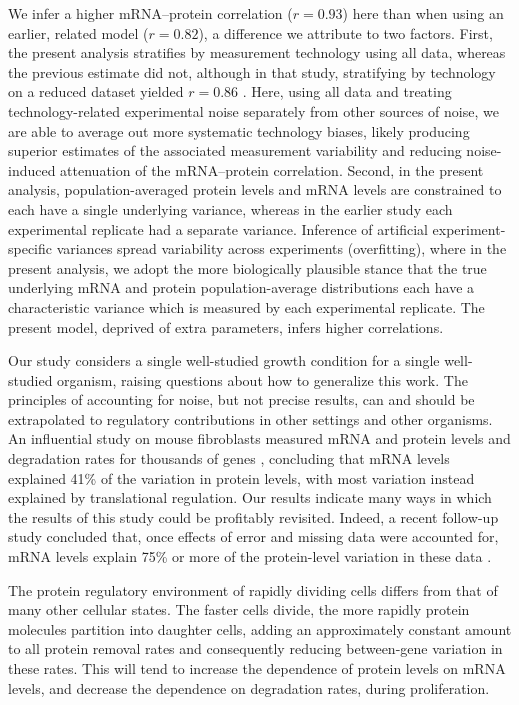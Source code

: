 \documentclass[10pt]{article}
\begin{document}
We infer a higher mRNA--protein correlation ($r=0.93$) here than when using an
earlier, related model \cite{Franks2014} ($r=0.82$), a difference we attribute
to two factors. First, the present analysis stratifies by measurement
technology using all data, whereas the previous estimate did not, although in
that study, stratifying by technology on a reduced dataset yielded $r=0.86$
\cite{Franks2014}. Here, using all data and treating technology-related
experimental noise separately from other sources of noise, we are able to
average out more systematic technology biases, likely producing superior
estimates of the associated measurement variability and reducing noise-induced
attenuation of the mRNA--protein correlation. Second, in the present analysis,
population-averaged protein levels and mRNA levels are constrained to each
have a single underlying variance, whereas in the earlier study each
experimental replicate had a separate variance. Inference of artificial
experiment-specific variances spread variability across experiments
(overfitting), where in the present analysis, we adopt the more biologically
plausible stance that the true underlying mRNA and protein population-average
distributions each have a characteristic variance which is measured by each
experimental replicate. The present model, deprived of extra parameters,
infers higher correlations.

Our study considers a single well-studied growth condition for a single well-
studied organism, raising questions about how to generalize this work. The
principles of accounting for noise, but not precise results, can and should be
extrapolated to regulatory contributions in other settings and other
organisms. An influential study on mouse fibroblasts measured mRNA and
protein levels and degradation rates for thousands of genes
\cite{schwanhausser11}, concluding that mRNA levels explained 41\% of  the
variation in protein levels, with most variation instead explained by
translational regulation. Our results indicate many ways in which the results
of this study could be profitably revisited. Indeed, a recent follow-up study
concluded that, once  effects of error and missing data were accounted for,
mRNA levels explain 75\% or more of the protein-level variation in these data
\cite{li14}.


The protein regulatory environment of rapidly dividing cells differs from that
of many other cellular states. The faster cells divide, the more rapidly
protein molecules partition into daughter cells, adding an approximately
constant amount to all protein removal rates and consequently reducing
between-gene variation in these rates. This will tend to increase the
dependence of protein levels on mRNA levels, and decrease the dependence on
degradation rates, during proliferation.
\end{document}
